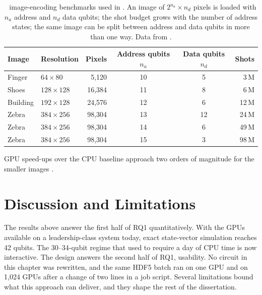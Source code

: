 \begin{table}[htbp]
\caption{\qcrank\ image-encoding benchmarks used in \cite{guo2025qgear}. An image of $2^{n_{a}}\times n_{d}$ pixels is loaded with $n_{a}$ address and $n_{d}$ data qubits; the shot budget grows with the number of address states; the same image can be split between address and data qubits in more than one way. Data from \cite{guo2025qgear}.}
\label{tab:qgear:qcrank}
\centering\small
\begin{threeparttable}
\begin{tabular}{@{}llrccr@{}}
\toprule
Image & Resolution & Pixels & Address qubits $n_{a}$ & Data qubits $n_{d}$ & Shots \\
\midrule
Finger   & $64\times 80$   & 5,120  & 10 & 5  & 3\,M \\
Shoes    & $128\times 128$ & 16,384 & 11 & 8  & 6\,M \\
Building & $192\times 128$ & 24,576 & 12 & 6  & 12\,M \\
Zebra    & $384\times 256$ & 98,304 & 13 & 12 & 24\,M \\
Zebra    & $384\times 256$ & 98,304 & 14 & 6  & 49\,M \\
Zebra    & $384\times 256$ & 98,304 & 15 & 3  & 98\,M \\
\bottomrule
\end{tabular}
\begin{tablenotes}\footnotesize
\item GPU speed-ups over the CPU baseline approach two orders of magnitude for the smaller images \cite{guo2025qgear}.
\end{tablenotes}
\end{threeparttable}
\end{table}

\section{Discussion and Limitations}\label{sec:qgear:discussion}

The results above answer the first half of RQ1 quantitatively. With the GPUs available on a leadership-class system today, exact state-vector simulation reaches 42 qubits. The 30--34-qubit regime that used to require a day of CPU time is now interactive. The design answers the second half of RQ1, usability. No circuit in this chapter was rewritten, and the same HDF5 batch ran on one GPU and on 1,024 GPUs after a change of two lines in a job script. Several limitations bound what this approach can deliver, and they shape the rest of the dissertation.

